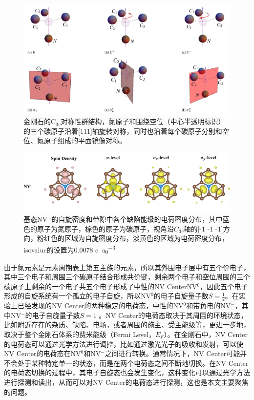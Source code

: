 \documentclass[type = bachelor]{whu-thesis}
\begin{document}
\begin{figure}
  \centering
  \includegraphics[width=1.0\textwidth]{figures/Chapter 1/NV Symmetry.png}
  \caption{金刚石的C$_{3v}$对称性群结构，氮原子和围绕空位（中心半透明标识）的三个碳原子沿着[111]轴旋转对称，同时也沿着每个碳原子分别和空位、氮原子组成的平面镜像对称。}
  \label{fig:NV Symmetry}
\end{figure}

\begin{figure}
  \centering
  \includegraphics[width=1.0\textwidth]{figures/Chapter 1/Spin and Charge Density.png}
  \caption{基态NV$^-$的自旋密度和带隙中各个缺陷能级的电荷密度分布，其中蓝色的原子为氮原子，棕色的原子为碳原子，视角沿$C_{3v}$轴的[-1 -1 -1]方向，粉红色的区域为自旋密度分布，淡黄色的区域为电荷密度分布，isovalue的设置为0.0078 \unit{e\per\bohr\cubed}}
  \label{fig:Spin and Charge Density}
\end{figure}

由于氮元素是元素周期表上第五主族的元素，所以其外围电子层中有五个价电子，其中三个电子和周围三个碳原子结合形成共价键，剩余两个电子和空位周围的三个碳原子上剩余的一个电子共五个电子形成了中性的NV CenterNV$^0$，因此五个电子形成的自旋系统有一个孤立的电子自旋，所以NV$^0$的电子自旋量子数$S=\frac{1}{2}$。在实验上已经发现的NV Center的两种稳定的电荷态，中性的NV$^0$和带负电的NV$^-$，其中NV$^-$的电子自旋量子数$S=1$ \cite{waldherr2011dark,aslam2013photo,dolde2014nanoscale}。NV Center的电荷态取决于其周围的环境状态，比如附近存在的杂质、缺陷、电场，或者周围的施主、受主能级等，更进一步地，取决于整个金刚石体系的费米能级（Fermi Level，$E_F$）\cite{doherty2013nitrogen}。在金刚石中，NV Center的电荷态可以通过光学方法进行调控，比如通过激光光子的吸收和发射，可以使NV Center的电荷态在NV$^0$和NV$^-$之间进行转换\cite{doi2016pure,siyushev2013optically,shields2015efficient}。通常情况下，NV Center可能并不会处于某种特定单一的状态，而是在两个电荷态之间不断地切换。在NV Center的电荷态切换的过程中，其电子自旋态也会发生变化，这种变化可以通过光学方法进行探测和读出，从而可以对NV Center的电荷态进行探测，这也是本文主要聚焦的问题。
\end{document}

